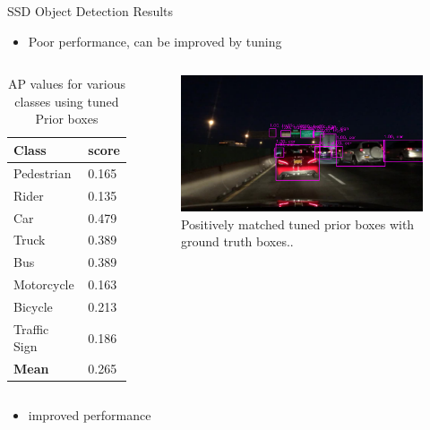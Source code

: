 \documentclass[10pt, aspectratio=169]{beamer}
\begin{document}
\begin{frame}[allowframebreaks]{SSD Object Detection Results}
    \begin{itemize}
        \item Poor performance, can be improved by tuning
    \end{itemize}

    \begin{columns}
            \begin{table}
                \caption{AP values for various classes using tuned Prior boxes}
                \begin{tabular}{ll}
                    \hline
                        \textbf{Class} & \textbf{score} \\ \hline
                        Pedestrian     & 0.165              \\ \hline
                        Rider          & 0.135              \\ \hline
                        Car            & 0.479              \\ \hline
                        Truck          & 0.389              \\ \hline
                        Bus            & 0.389               \\ \hline 
                        Motorcycle     & 0.163              \\ \hline
                        Bicycle        & 0.213              \\ \hline
                        Traffic Sign   & 0.186              \\ \hline
                        \textbf{Mean}  & 0.265  \\\hline
                \end{tabular}
            \end{table}
            \begin{figure}[!ht]
                \centering
                \includegraphics[scale=0.175]{images/tuned_9.png}
                \caption[SSD framework]{Positively matched tuned prior boxes with ground truth boxes..}
            \end{figure}
    \end{columns}
    \begin{itemize}
        \item improved performance
    \end{itemize}
\end{frame}
\end{document}
